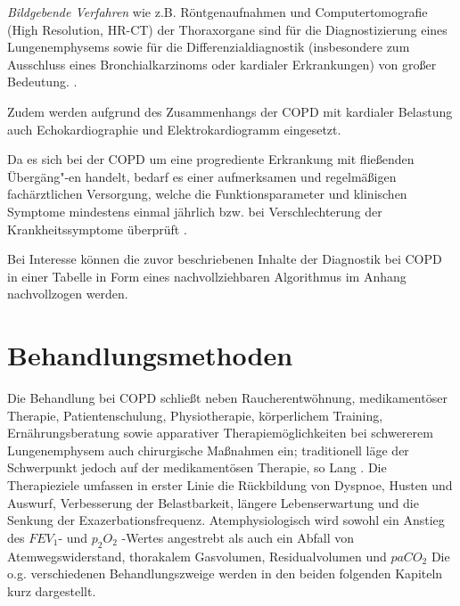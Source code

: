 \emph{Bildgebende Verfahren} wie z.B. Röntgenaufnahmen und Computertomografie (High Resolution, HR-CT) der Thoraxorgane sind für die Diagnostizierung eines Lungenemphysems sowie für die Differenzialdiagnostik (insbesondere zum Ausschluss eines Bronchialkarzinoms oder kardialer Erkrankungen) von großer Bedeutung. \autocite[191]{welte2007}.

Zudem werden aufgrund des Zusammenhangs der COPD mit kardialer Belastung auch Echokardiographie und Elektrokardiogramm eingesetzt.

Da es sich bei der COPD um eine progrediente Erkrankung mit fließenden Übergäng"-en handelt, bedarf es einer aufmerksamen und regelmäßigen fachärztlichen Versorgung, welche die Funktionsparameter und klinischen Symptome mindestens einmal jährlich bzw. bei Verschlechterung der Krankheitssymptome überprüft \autocite[vgl.][e8ff.]{vogelmeier2007}.

Bei Interesse können die zuvor beschriebenen Inhalte der Diagnostik bei COPD in einer Tabelle in Form eines nachvollziehbaren Algorithmus im Anhang nachvollzogen werden.

\section{Behandlungsmethoden}
\label{behandlungsmethoden}
Die Behandlung bei COPD schließt neben Raucherentwöhnung, medikamentöser Therapie, Patientenschulung, Physiotherapie, körperlichem Training, Ernährungsberatung sowie apparativer Therapiemöglichkeiten bei schwererem Lungenemphysem auch chirurgische Maßnahmen ein; traditionell läge der Schwerpunkt jedoch auf der medikamentösen Therapie, so Lang \autocite[vgl.][287]{lang2007}. Die Therapieziele umfassen in erster Linie die Rückbildung von Dyspnoe, Husten und Auswurf, Verbesserung der Belastbarkeit, längere Lebenserwartung und die Senkung der Exazerbationsfrequenz. Atemphysiologisch wird sowohl ein Anstieg des $FEV_{1}$- und $p_{2}O_{2}$ -Wertes angestrebt als auch ein Abfall von Atemwegswiderstand, thorakalem Gasvolumen, Residualvolumen und $paCO_{2}$ \autocite[vgl.][158]{lorenz2009}
Die o.g. verschiedenen Behandlungszweige werden in den beiden folgenden Kapiteln kurz dargestellt.

